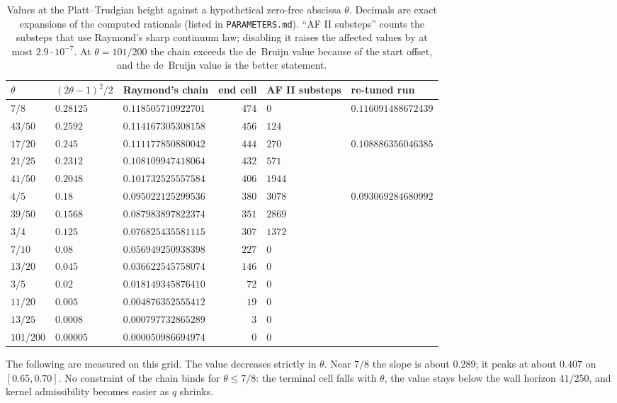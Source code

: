 \documentclass[11pt]{article}
\theoremstyle{definition}
\begin{document}
\begin{table}[ht]
\centering
\small
\begin{tabular}{@{}l l l r l l@{}}
\toprule
$\theta$ & $(2\theta-1)^2/2$ & Raymond's chain & end cell & AF II substeps & re-tuned run\\
\midrule
$7/8$ & $0.28125$ & $0.118505710922701$ & $474$ & $0$ & $0.116091488672439$\\
$43/50$ & $0.2592$ & $0.114167305308158$ & $456$ & $124$ & \\
$17/20$ & $0.245$ & $0.111177850880042$ & $444$ & $270$ & $0.108886356046385$\\
$21/25$ & $0.2312$ & $0.108109947418064$ & $432$ & $571$ & \\
$41/50$ & $0.2048$ & $0.101732525557584$ & $406$ & $1944$ & \\
$4/5$ & $0.18$ & $0.095022125299536$ & $380$ & $3078$ & $0.093069284680992$\\
$39/50$ & $0.1568$ & $0.087983897822374$ & $351$ & $2869$ & \\
$3/4$ & $0.125$ & $0.076825435581115$ & $307$ & $1372$ & \\
$7/10$ & $0.08$ & $0.056949250938398$ & $227$ & $0$ & \\
$13/20$ & $0.045$ & $0.036622545758074$ & $146$ & $0$ & \\
$3/5$ & $0.02$ & $0.018149345876410$ & $72$ & $0$ & \\
$11/20$ & $0.005$ & $0.004876352555412$ & $19$ & $0$ & \\
$13/25$ & $0.0008$ & $0.000797732865289$ & $3$ & $0$ & \\
$101/200$ & $0.00005$ & $0.000050986694974$ & $0$ & $0$ & \\
\bottomrule
\end{tabular}
\caption{Values at the Platt--Trudgian height against a hypothetical zero-free abscissa
$\theta$. Decimals are exact expansions of the computed rationals (listed in
\texttt{PARAMETERS.md}). ``AF II substeps'' counts the substeps that use Raymond's sharp
continuum law; disabling it raises the affected values by at most $2.9\cdot10^{-7}$. At
$\theta=101/200$ the chain exceeds the de~Bruijn value because of the start offset, and the
de~Bruijn value is the better statement.}
\label{tab:theta}
\end{table}

The following are measured on this grid. The value decreases strictly in $\theta$. Near
$7/8$ the slope is about $0.289$; it peaks at about $0.407$ on $[0.65,0.70]$. No constraint
of the chain binds for $\theta\le7/8$: the terminal cell falls with $\theta$, the value
stays below the wall horizon $41/250$, and kernel admissibility becomes easier as $q$
shrinks.
\end{document}
